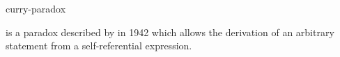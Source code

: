 \documentclass{stex}
\begin{document}
\begin{smodule}{curry-paradox}
\begin{sparagraph}[style=symdoc]
   is a paradox described by  in 1942 which allows the derivation of an arbitrary statement from a self-referential expression.
\end{sparagraph}
\end{smodule}
\end{document}
